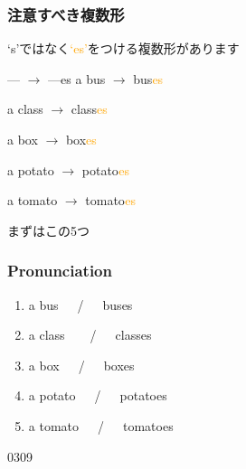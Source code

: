 \documentclass[aspectratio=169,xcolor={dvipsnames,table}]{beamer}
\newcommand{\myaudio}[1]{\href{#1}{\faVolumeUp}}
\begin{document}
\begin{frame}[plain]\frametitle{注意すべき複数形}

{\Large `s'ではなく\textcolor{orange}{`es'}をつける複数形があります}
\pause

\bigskip

\begin{block}{--- $\rightarrow$ ---es}
a bus \pause$\longrightarrow$ bus\textcolor{orange}{es}\pause%
\hfill{}\hspace*{250pt}\pause

a class \pause$\longrightarrow$ class\textcolor{orange}{es}\pause
\hfill{}\hspace*{250pt}\pause

a box \pause $\longrightarrow$ box\textcolor{orange}{es}\pause
\hfill{}\hspace*{250pt}\pause

a potato \pause$\longrightarrow$ potato\textcolor{orange}{es}\pause
\hfill{}\hspace*{250pt}\pause

a tomato \pause$\longrightarrow$ tomato\textcolor{orange}{es}\pause
\hfill{}\hspace*{250pt}
\end{block}
\pause

\hfill{\scriptsize まずはこの5つ}
\end{frame}
\begin{frame}[plain]\frametitle{Pronunciation}

\begin{enumerate}
 \item a bus~~~\pause{}/~~~buses\pause%
\hfill{}\hspace{180pt}\mbox{} \item a class~~~~\pause{}/~~~classes\pause%
\hfill{}\hspace{180pt}\mbox{}
 \item a box~~~\pause{}/~~~boxes\pause%
\hfill{}\hspace{180pt}\mbox{}
 \item a potato~~~\pause{}/~~~potatoes\pause%
\hfill{}\hspace{180pt}\mbox{} \item a tomato~~~\pause{}/~~~tomatoes%
\hfill{}\hspace{180pt}\mbox{}
 \end{enumerate}

\bigskip

\bigskip

\mbox{}\hfill{\tiny 0309}\,{\scriptsize \myaudio{./audio/005_singular_plural_07.mp3}}
\end{frame}
\end{document}
